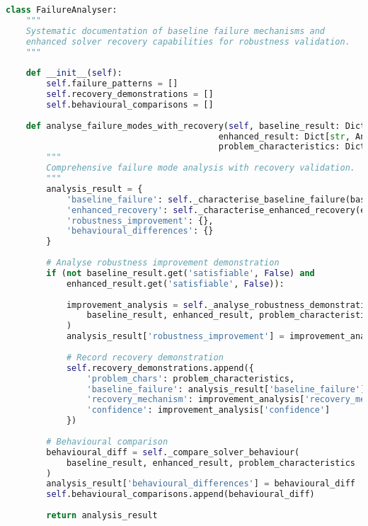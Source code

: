\begin{lstlisting}[language=Python, caption=Systematic Failure Mode Analysis and Recovery Validation]
class FailureAnalyser:
    """
    Systematic documentation of baseline failure mechanisms and
    enhanced solver recovery capabilities for robustness validation.
    """
    
    def __init__(self):
        self.failure_patterns = []
        self.recovery_demonstrations = []
        self.behavioural_comparisons = []
    
    def analyse_failure_modes_with_recovery(self, baseline_result: Dict[str, Any], 
                                          enhanced_result: Dict[str, Any],
                                          problem_characteristics: Dict[str, Any]) -> Dict[str, Any]:
        """
        Comprehensive failure mode analysis with recovery validation.
        """
        analysis_result = {
            'baseline_failure': self._characterise_baseline_failure(baseline_result),
            'enhanced_recovery': self._characterise_enhanced_recovery(enhanced_result),
            'robustness_improvement': {},
            'behavioural_differences': {}
        }
        
        # Analyse robustness improvement demonstration
        if (not baseline_result.get('satisfiable', False) and 
            enhanced_result.get('satisfiable', False)):
            
            improvement_analysis = self._analyse_robustness_demonstration(
                baseline_result, enhanced_result, problem_characteristics
            )
            analysis_result['robustness_improvement'] = improvement_analysis
            
            # Record recovery demonstration
            self.recovery_demonstrations.append({
                'problem_chars': problem_characteristics,
                'baseline_failure': analysis_result['baseline_failure'],
                'recovery_mechanism': improvement_analysis['recovery_mechanism'],
                'confidence': improvement_analysis['confidence']
            })
        
        # Behavioural comparison
        behavioural_diff = self._compare_solver_behaviour(
            baseline_result, enhanced_result, problem_characteristics
        )
        analysis_result['behavioural_differences'] = behavioural_diff
        self.behavioural_comparisons.append(behavioural_diff)
        
        return analysis_result
    

\end{lstlisting}
